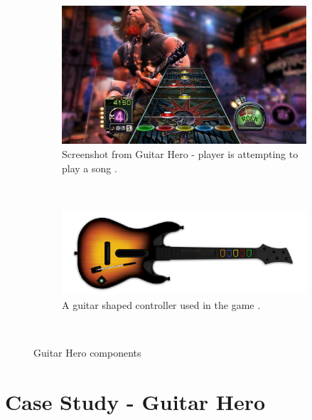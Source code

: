 \begin{figure}
        \centering
        \begin{subfigure}[b]{0.48\textwidth}
                \includegraphics[width=\textwidth]{Figures/guitarhero}
                \caption{Screenshot from Guitar Hero - player is attempting to play a song \cite{ghscreen}.}
                \label{fig:Guitar Hero screenshot}
        \end{subfigure}%
        ~ %
        \begin{subfigure}[b]{0.48\textwidth}
                \includegraphics[width=\textwidth]{Figures/controller}
                \caption{A guitar shaped controller used in the game \cite{controller}.}
                \label{fig:Controller}
        \end{subfigure}
          \caption{Guitar Hero components}
        ~ %
        \label{fig:GH}
\end{figure}

\vspace{20pt}


\section{Case Study - Guitar Hero}

